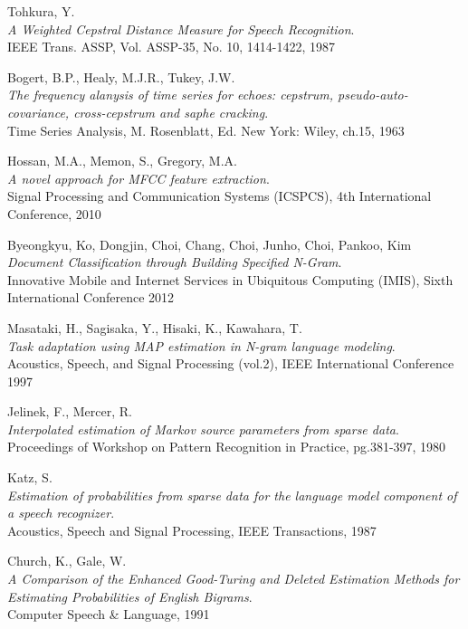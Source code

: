 \begin{thebibliography}{99}
  {\sc Tohkura,} Y.\\
  \emph{A Weighted Cepstral Distance Measure for Speech Recognition}.\\
  IEEE Trans. ASSP, Vol. ASSP-35, No. 10, 1414-1422, 1987

  {\sc Bogert,} B.P., {\sc Healy,} M.J.R., {\sc Tukey,} J.W.\\
  \emph{The frequency alanysis of time series for echoes: cepstrum, pseudo-auto-covariance, cross-cepstrum and saphe cracking}.\\
  Time Series Analysis, M. Rosenblatt, Ed. New York: Wiley, ch.15, 1963

  {\sc Hossan,} M.A., {\sc Memon,} S., {\sc Gregory,} M.A.\\
  \emph{A novel approach for MFCC feature extraction}.\\
  Signal Processing and Communication Systems (ICSPCS), 4th International Conference, 2010
  
  {\sc Byeongkyu,} Ko, {\sc Dongjin,} Choi, {\sc Chang,} Choi, {\sc Junho,} Choi, {\sc Pankoo,} Kim\\
  \emph{Document Classification through Building Specified N-Gram}.\\
  Innovative Mobile and Internet Services in Ubiquitous Computing (IMIS), Sixth International Conference 2012

  {\sc Masataki,} H., {\sc Sagisaka,} Y., {\sc Hisaki,} K., {\sc Kawahara,} T.\\
  \emph{Task adaptation using MAP estimation in N-gram language modeling}.\\
  Acoustics, Speech, and Signal Processing (vol.2), IEEE International Conference 1997

  {\sc Jelinek,} F., {\sc Mercer,} R.\\
  \emph{Interpolated estimation of Markov source parameters from sparse data}.\\
  Proceedings of Workshop on Pattern Recognition in Practice, pg.381-397, 1980

  {\sc Katz,} S.\\
  \emph{Estimation of probabilities from sparse data for the language model component of a speech recognizer}.\\
  Acoustics, Speech and Signal Processing, IEEE Transactions, 1987

  {\sc Church,} K., {\sc Gale,} W.\\
  \emph{A Comparison of the Enhanced Good-Turing and Deleted Estimation Methods for Estimating Probabilities of English Bigrams}.\\
  Computer Speech \& Language, 1991


\end{thebibliography}
